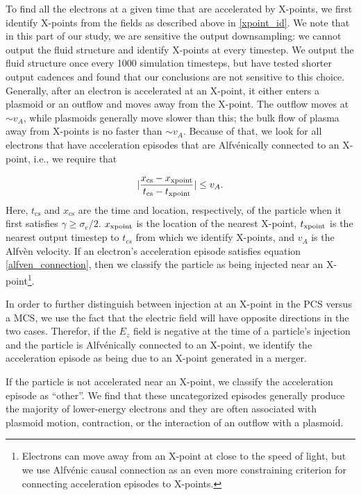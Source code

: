 To find all the electrons at a given time that are accelerated by X-points, we first identify X-points from the fields as described above in \ref{xpoint_id}.  We note that in this part of our study, we are sensitive the output downsampling: we cannot output the fluid structure and identify X-points at every timestep.  We output the fluid structure once every 1000 simulation timesteps, but have tested shorter output cadences and found that our conclusions are not sensitive to this choice. Generally, after an electron is accelerated at an X-point, it either enters a plasmoid or an outflow and moves away from the X-point.  The outflow moves at $\sim v_{A}$, while plasmoids generally move slower than this; the bulk flow of plasma away from X-points is no faster than $\sim v_{A}$.  Because of that, we look for all electrons that have acceleration episodes that are Alfv\'enically connected to an X-point, i.e., we require that 

\begin{equation}\label{alfven_connection}
\lvert\frac{x_{\textrm{cs}} - x_{\rm{xpoint}}}{t_{\textrm{cs}}-t_{\rm{xpoint}}}\rvert \le v_{A}.
\end{equation}
Here, $t_{\textrm{cs}}$ and $x_{\textrm{cs}}$ are the time and location, respectively, of the particle when it first satisfies $\gamma \geq \sigma_{e}/2$. $x_{\rm{xpoint}}$ is the location of the nearest X-point, $t_{\rm{xpoint}}$ is the nearest output timestep to $t_{cs}$ from which we identify X-points, and $v_{A}$ is the Alfv\`en velocity.  If an electron's acceleration episode satisfies equation \ref{alfven_connection}, then we classify the particle as being injected near an X-point\footnote{Electrons can move away from an X-point at close to the speed of light, but we use Alfv\'enic causal connection as an even more constraining criterion for connecting acceleration episodes to X-points.}.

In order to further distinguish between injection at an X-point in the PCS versus a MCS, we use the fact that the electric field will have opposite directions in the two cases.  Therefor, if the $E_{z}$ field is negative at the time of a particle's injection and the particle is Alfv\'enically connected to an X-point, we identify the acceleration episode as being due to an X-point generated in a merger.

If the particle is not accelerated near an X-point, we classify the acceleration episode as ``other''.  We find that these uncategorized episodes generally produce the majority of lower-energy electrons and they are often associated with plasmoid motion, contraction, or the interaction of an outflow with a plasmoid.  

